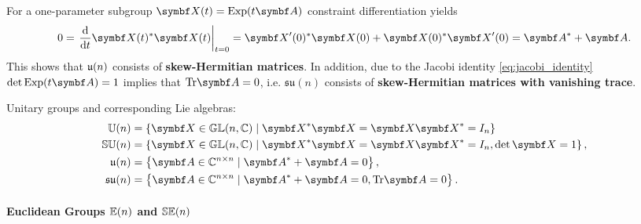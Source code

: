 For a one-parameter subgroup $\X(t) = \Exp(t \A)$ constraint differentiation yields
\begin{equation}
  0 = \left. \frac{\mathrm{d}}{\mathrm{d} t} \X(t)^* \X(t) \right|_{t=0} = \X'(0)^* \X(0) + \X(0)^* \X'(0) = \A^* + \A.
\end{equation}
This shows that ${\mathfrak{u}(n)}$ consists of \textbf{skew-Hermitian matrices}. In addition, due to the Jacobi identity \eqref{eq:jacobi_identity} $\det \Exp(t \A) = 1$ implies that $\tr \A = 0$, i.e. $\mathfrak{su}(n)$ consists of \textbf{skew-Hermitian matrices with vanishing trace}.
\begin{important}
  Unitary groups and corresponding Lie algebras:
  \begin{subequations}
    \begin{align}
      \Un              & = \left\{ \X \in \GL(n, \mathbb{C}) \mid \X^{*} \X = \X \X^{*}= I_{n} \right\}               \\
      \SUn             & = \left\{ \X \in \GL(n, \mathbb{C}) \mid \X^{*} \X = \X \X^{*}= I_{n}, \det \X = 1 \right\}, \\
      \un              & = \left\{ \A \in \mathbb{C}^{n \times n} \mid \A^* + \A = 0 \right\},                        \\
      \mathfrak{su}(n) & = \left\{ \A \in \mathbb{C}^{n \times n} \mid \A^* + \A = 0, \tr \A = 0 \right\}.
    \end{align}
  \end{subequations}
\end{important}

\paragraph{Euclidean Groups ${\mathbb{E}(n)}$ and ${\mathbb{SE}(n)}$}

